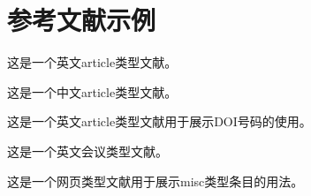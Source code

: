 \chapter{参考文献示例}
这是一个英文article类型文献\cite{ChangHTD19}。
\par
这是一个中文article类型文献\cite{WangZSS21}。
\par
这是一个英文article类型文献\cite{GongL21}用于展示DOI号码的使用。
\par
这是一个英文会议类型文献\cite{TsaiCLQLB13}。
\par
这是一个网页类型文献\cite{Collinson21}用于展示misc类型条目的用法。
